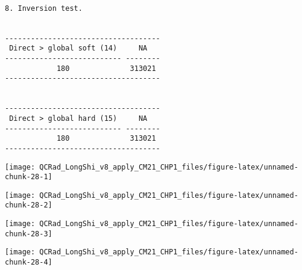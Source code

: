\documentclass[
  10pt,
  a4paper,oneside]{article}
\newenvironment{Shaded}{\begin{snugshade}}{\end{snugshade}}
\newcommand{\AttributeTok}[1]{\textcolor[rgb]{0.77,0.63,0.00}{#1}}
\newcommand{\ConstantTok}[1]{\textcolor[rgb]{0.00,0.00,0.00}{#1}}
\newcommand{\ErrorTok}[1]{\textcolor[rgb]{0.64,0.00,0.00}{\textbf{#1}}}
\newcommand{\FunctionTok}[1]{\textcolor[rgb]{0.00,0.00,0.00}{#1}}
\newcommand{\NormalTok}[1]{#1}
\newcommand{\SpecialCharTok}[1]{\textcolor[rgb]{0.00,0.00,0.00}{#1}}
\newcommand{\StringTok}[1]{\textcolor[rgb]{0.31,0.60,0.02}{#1}}
\begin{document}
\begin{Shaded}
\end{Shaded}

\begin{verbatim}

8. Inversion test.


------------------------------------
 Direct > global soft (14)     NA   
--------------------------- --------
            180              313021 
------------------------------------


------------------------------------
 Direct > global hard (15)     NA   
--------------------------- --------
            180              313021 
------------------------------------
\end{verbatim}

\begin{center}\texttt{[image: QCRad\_LongShi\_v8\_apply\_CM21\_CHP1\_files/figure-latex/unnamed-chunk-28-1]} \end{center}

\begin{center}\texttt{[image: QCRad\_LongShi\_v8\_apply\_CM21\_CHP1\_files/figure-latex/unnamed-chunk-28-2]} \end{center}

\begin{center}\texttt{[image: QCRad\_LongShi\_v8\_apply\_CM21\_CHP1\_files/figure-latex/unnamed-chunk-28-3]} \end{center}

\begin{center}\texttt{[image: QCRad\_LongShi\_v8\_apply\_CM21\_CHP1\_files/figure-latex/unnamed-chunk-28-4]} \end{center}
\end{document}

